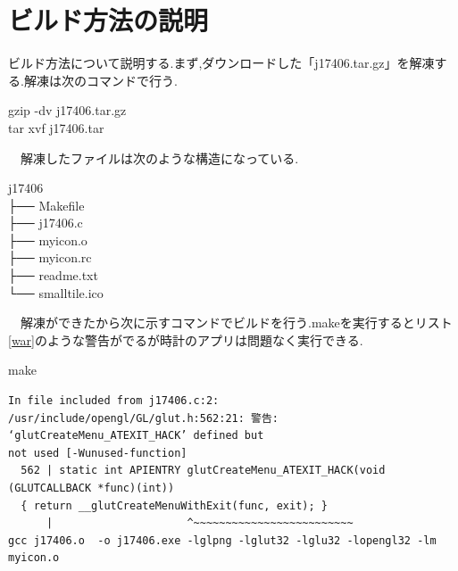 \documentclass[a4j]{jarticle}
\begin{document}
    \section{ビルド方法の説明}
    ビルド方法について説明する.まず,ダウンロードした「j17406.tar.gz」を解凍する.解凍は次のコマンドで行う.
  \begin{screen}
    gzip -dv j17406.tar.gz \\
    tar xvf j17406.tar
  \end{screen}
  　解凍したファイルは次のような構造になっている.
  \begin{screen}
j17406 \\
├── Makefile \\
├── j17406.c \\
├── myicon.o \\
├── myicon.rc \\
├── readme.txt \\
└── smalltile.ico 
  \end{screen}
  　解凍ができたから次に示すコマンドでビルドを行う.makeを実行するとリスト\ref{war}のような警告がでるが時計のアプリは問題なく実行できる.
  \begin{screen}
make
  \end{screen}

  \begin{lstlisting}[basicstyle=\ttfamily\footnotesize, frame=single,label=war,caption=コンパイル時の警告]
In file included from j17406.c:2:
/usr/include/opengl/GL/glut.h:562:21: 警告: ‘glutCreateMenu_ATEXIT_HACK’ defined but 
not used [-Wunused-function]
  562 | static int APIENTRY glutCreateMenu_ATEXIT_HACK(void (GLUTCALLBACK *func)(int)) 
  { return __glutCreateMenuWithExit(func, exit); }
      |                     ^~~~~~~~~~~~~~~~~~~~~~~~~~
gcc j17406.o  -o j17406.exe -lglpng -lglut32 -lglu32 -lopengl32 -lm myicon.o
  \end{lstlisting}
\end{document}
